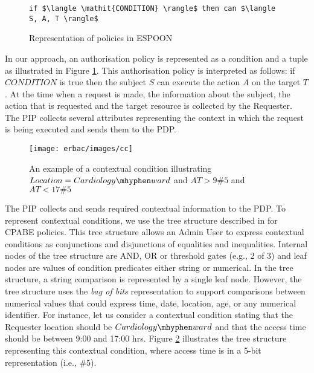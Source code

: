 \documentclass[epsfig,a4paper,11pt,titlepage]{book}
\numberwithin{algorithm}{chapter}
\newcommand{\Keywords}{\lstset{keywords={if,then,can,be,active,in,execute}}}
\begin{document}
\begin{figure} [htp]
\Keywords
\begin{lstlisting}[style=AMMA,numbers=none,breaklines,mathescape,rulesepcolor=\color{black}]
if $\langle \mathit{CONDITION} \rangle$ then can $\langle S, A, T \rangle$

\end{lstlisting}
\caption[Representation of policies in ESPOON]{Representation of policies in \gls{ESPOON}}
\label{fig:espoon-policy-representation}
\end{figure}

In our approach, an authorisation policy is represented as a condition and a tuple as illustrated in Figure \ref{fig:espoon-policy-representation}. This authorisation policy is interpreted as follows: if $\mathit{CONDITION}$ is true then the subject $S$ can execute the action $A$ on the target $T$. At the time when a request is made, the information about the subject, the action that is requested and the target resource is collected by the Requester. The \gls{PIP} collects several attributes representing the context in which the request is being executed and sends them to the \gls{PDP}.

\begin{figure} [htp]
\centering
\texttt{[image: erbac/images/cc]}
\caption[An example of a contextual condition]{An example of a contextual condition illustrating $Location=Cardiology \mhyphen ward$ and $AT > 9\#5$ and $AT < 17\#5$}
\label{fig:erbac-cc}
\end{figure}


The \gls{PIP} collects and sends required contextual information to the \gls{PDP}. To represent contextual conditions, we use the tree structure described in \cite{Bethencourt:2007} for \gls{CPABE} policies. This tree structure allows an Admin User to express contextual conditions as conjunctions and disjunctions of equalities and inequalities. Internal nodes of the tree structure are AND, OR or threshold gates (e.g., 2 of 3) and leaf nodes are values of condition predicates either string or numerical. In the tree structure, a string comparison is represented by a single leaf node. However, the tree structure uses the \emph{bag of bits} representation to support comparisons between numerical values that could express time, date, location, age, or any numerical identifier. For instance, let us consider a contextual condition stating that the Requester location should be $Cardiology \mhyphen ward$ and that the access time should be between 9:00 and 17:00 hrs. Figure \ref{fig:erbac-cc} illustrates the tree structure representing this contextual condition, where access time is in a 5-bit representation (i.e., \#5).
\end{document}
